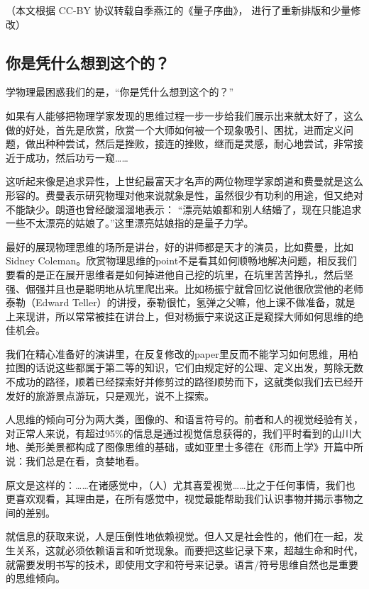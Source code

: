 
（本文根据 CC-BY 协议转载自季燕江的《量子序曲》， 进行了重新排版和少量修改）

\subsection{你是凭什么想到这个的？}

学物理最困惑我们的是，“你是凭什么想到这个的？”

如果有人能够把物理学家发现的思维过程一步一步给我们展示出来就太好了，这么做的好处，首先是欣赏，欣赏一个大师如何被一个现象吸引、困扰，进而定义问题，做出种种尝试，然后是挫败，接连的挫败，继而是灵感，耐心地尝试，非常接近于成功，然后功亏一窥……

这听起来像是追求异性，上世纪最富天才名声的两位物理学家朗道和费曼就是这么形容的。费曼表示研究物理对他来说就象是性，虽然很少有功利的用途，但又绝对不能缺少。朗道也曾经酸溜溜地表示： “漂亮姑娘都和别人结婚了，现在只能追求一些不太漂亮的姑娘了。”这里漂亮姑娘指的是量子力学。


最好的展现物理思维的场所是讲台，好的讲师都是天才的演员，比如费曼，比如Sidney Coleman。欣赏物理思维的point不是看其如何顺畅地解决问题，相反我们要看的是正在展开思维者是如何掉进他自己挖的坑里，在坑里苦苦挣扎，然后坚强、倔强并且也是聪明地从坑里爬出来。比如杨振宁就曾回忆说他很欣赏他的老师泰勒（Edward Teller）的讲授，泰勒很忙，氢弹之父嘛，他上课不做准备，就是上来现讲，所以常常被挂在讲台上，但对杨振宁来说这正是窥探大师如何思维的绝佳机会。

我们在精心准备好的演讲里，在反复修改的paper里反而不能学习如何思维，用柏拉图的话说这些都属于第二等的知识，它们由规定好的公理、定义出发，剪除无数不成功的路径，顺着已经探索好并修剪过的路径顺势而下，这就类似我们去已经开发好的旅游景点游玩，只是观光，说不上探索。

人思维的倾向可分为两大类，图像的、和语言符号的。前者和人的视觉经验有关，对正常人来说，有超过95\%的信息是通过视觉信息获得的，我们平时看到的山川大地、美形美景都构成了图像思维的基础，或如亚里士多德在《形而上学》开篇中所说：我们总是在看，贪婪地看。

原文是这样的：……在诸感觉中，（人）尤其喜爱视觉……比之于任何事情，我们也更喜欢观看，其理由是，在所有感觉中，视觉最能帮助我们认识事物并揭示事物之间的差别。

就信息的获取来说，人是压倒性地依赖视觉。但人又是社会性的，他们在一起，发生关系，这就必须依赖语言和听觉现象。而要把这些记录下来，超越生命和时代，就需要发明书写的技术，即使用文字和符号来记录。语言/符号思维自然也是重要的思维倾向。

